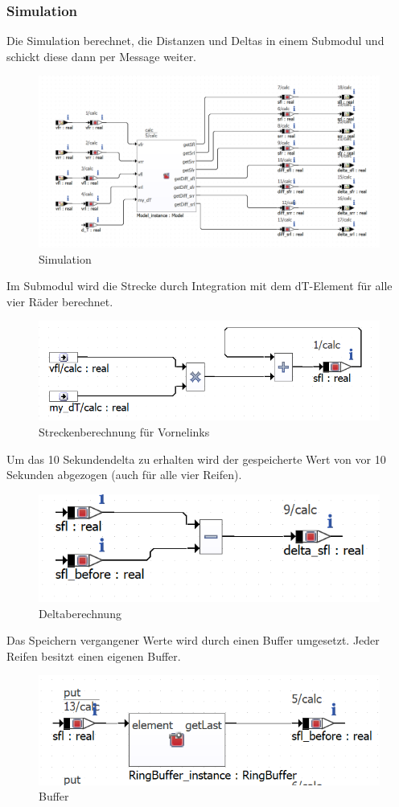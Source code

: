 \subsubsection{Simulation}
Die Simulation berechnet, die Distanzen und Deltas in einem Submodul und schickt diese dann per Message weiter.
\begin{figure}[H]
	\centering
\includegraphics[width=1\linewidth]{../Graphiken/ModelSim}
\caption{Simulation}
\label{fig:Sim}
\end{figure}
Im Submodul wird die Strecke durch Integration mit dem dT-Element für alle vier Räder berechnet.
\begin{figure}[H]
	\centering
	\includegraphics[width=0.6\linewidth]{../Graphiken/integrate}
	\caption{Streckenberechnung für Vornelinks}
	\label{fig:Sim}
\end{figure}
Um das 10 Sekundendelta zu erhalten wird der gespeicherte Wert von vor 10 Sekunden abgezogen (auch für alle vier Reifen).
\begin{figure}[H]
	\centering
	\includegraphics[width=0.5\linewidth]{../Graphiken/delta}
	\caption{Deltaberechnung}
	\label{fig:delta}
\end{figure}
Das Speichern vergangener Werte wird durch einen Buffer umgesetzt. Jeder Reifen besitzt einen eigenen Buffer.
\begin{figure}[H]
	\centering
	\includegraphics[width=0.6\linewidth]{../Graphiken/RinbufferApp}
	\caption{Buffer}
	\label{fig:Buffer}
\end{figure}

